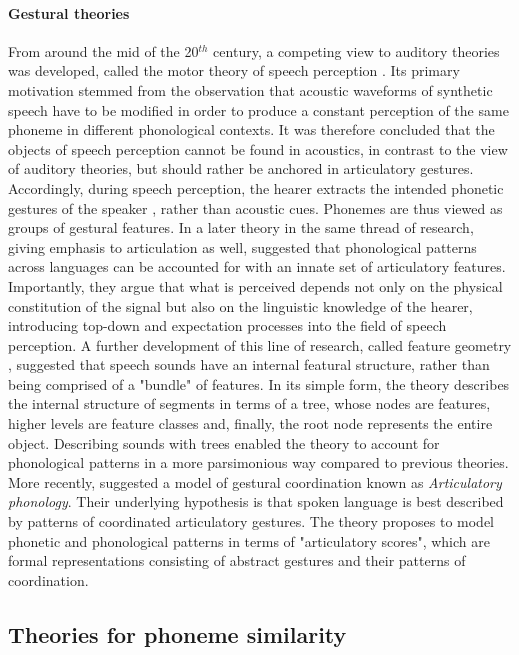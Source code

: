 \paragraph{Gestural theories}
From around the mid of the 20$^{th}$ century, a competing view to auditory theories was developed, called the motor theory of speech perception \citep{cooper1952some, liberman1967perception}. Its primary motivation stemmed from the observation that acoustic waveforms of synthetic speech have to be modified in order to produce a constant perception of the same phoneme in different phonological contexts. It was therefore concluded that the objects of speech perception cannot be found in acoustics, in contrast to the view of auditory theories, but should rather be anchored in articulatory gestures. Accordingly, during speech perception, the hearer extracts the intended phonetic gestures of the speaker \citep{liberman1985motor}, rather than acoustic cues. Phonemes are thus viewed as groups of gestural features. In a later theory in the same thread of research, giving emphasis to articulation as well, \citet{ChomskyHalle1968} suggested that phonological patterns across languages can be accounted for with an innate set of articulatory features. Importantly, they argue that what is perceived depends not only on the physical constitution of the signal but also on the linguistic knowledge of the hearer, introducing top-down and expectation processes into the field of speech perception. A further development of this line of research, called feature geometry \citep{clements1985, sagey1986representation}, suggested that speech sounds have an internal featural structure, rather than being comprised of a "bundle" of features. In its simple form, the theory describes the internal structure of segments in terms of a tree, whose nodes are features, higher levels are feature classes and, finally, the root node represents the entire object. Describing sounds with trees enabled the theory to account for phonological patterns in a more parsimonious way compared to previous theories. More recently, \citet{browman1990tiers, browman1992articulatory} suggested a model of gestural coordination known as \textit{Articulatory phonology}. Their underlying hypothesis is that spoken language is best described by patterns of coordinated articulatory gestures. The theory proposes to model phonetic and phonological patterns in terms of "articulatory scores", which are formal representations consisting of abstract gestures and their patterns of coordination.


\subsection{Theories for phoneme similarity}
